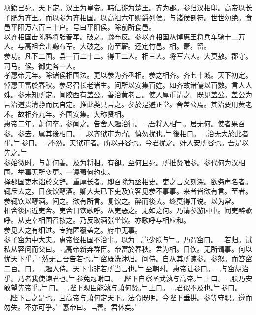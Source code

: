 \documentclass{zhvt-classic}
\begin{document}
\hspace*{2em}项籍已死。天下定。汉王为皇帝。韩信徙为楚王。齐为郡。参归汉相印。高帝以长子肥为齐王。而以参为齐相国。以高祖六年赐爵列侯。与诸侯剖符。世世勿绝。食邑平阳万六百三十户。号曰平阳侯。除前所食邑。\\
\hspace*{2em}以齐相国击陈豨将张春军。破之。黥布反。参以齐相国从悼惠王将兵车骑十二万人。与高祖会击黥布军。大破之。南至蕲。还定竹邑。相。萧。留。\\
\hspace*{2em}参功。凡下二国。县一百二十二。得王二人。相三人。将军六人。大莫敖。郡守。司马。候。御史各一人。\\
\hspace*{2em}孝惠帝元年。除诸侯相国法。更以参为齐丞相。参之相齐。齐七十城。天下初定。悼惠王富於春秋。参尽召长老诸生。问所以安集百姓。如齐故诸儒以百数。言人人殊。参未知所定。闻胶西有盖公。善治黄老言。使人厚币请之。既见盖公。盖公为言治道贵清静而民自定。推此类具言之。参於是避正堂。舍盖公焉。其治要用黄老术。故相齐九年。齐国安集。大称贤相。\\
\hspace*{2em}惠帝二年。萧何卒。参闻之。告舍人趣治行。﹁吾将入相﹂。居无何。使者果召参。参去。属其後相曰。﹁以齐狱市为寄。慎勿扰也。﹂後相曰。﹁治无大於此者乎。﹂参曰。﹁不然。夫狱市者。所以并容也。今君扰之。奸人安所容也。吾是以先之。﹂\\
\hspace*{2em}参始微时。与萧何善。及为将相。有卻。至何且死。所推贤唯参。参代何为汉相国。举事无所变更。一遵萧何约束。\\
\hspace*{2em}择郡国吏木诎於文辞。重厚长者。即召除为丞相史。吏之言文刻深。欲务声名者。辄斥去之。日夜饮醇酒。卿大夫已下吏及宾客见参不事事。来者皆欲有言。至者。参辄饮以醇酒。间之。欲有所言。复饮之。醉而後去。终莫得开说。以为常。\\
\hspace*{2em}相舍後园近吏舍。吏舍日饮歌呼。从吏恶之。无如之何。乃请参游园中。闻吏醉歌呼。从吏幸相国召按之。乃反取酒张坐饮。亦歌呼与相应和。\\
\hspace*{2em}参见人之有细过。专掩匿覆盖之。府中无事。\\
\hspace*{2em}参子窋为中大夫。惠帝怪相国不治事。以为﹁岂少朕与﹂。乃谓窋曰。﹁若归。试私从容问而父曰。﹃高帝新弃群臣。帝富於春秋。君为相。日饮。无所请事。何以忧天下乎。﹄然无言吾告若也。﹂窋既洗沐归。间侍。自从其所谏参。参怒。而笞窋二百。曰。﹁趣入侍。天下事非若所当言也。﹂至朝时。惠帝让参曰。﹁与窋胡治乎。乃者我使谏君也。﹂参免冠谢曰。﹁陛下自察圣武孰与高帝。﹂上曰。﹁朕乃安敢望先帝乎。﹂曰。﹁陛下观臣能孰与萧何贤。﹂上曰。﹁君似不及也。﹂参曰。﹁陛下言之是也。且高帝与萧何定天下。法令既明。今陛下垂拱。参等守职。遵而勿失。不亦可乎。﹂惠帝曰。﹁善。君休矣。﹂\\
\end{document}
